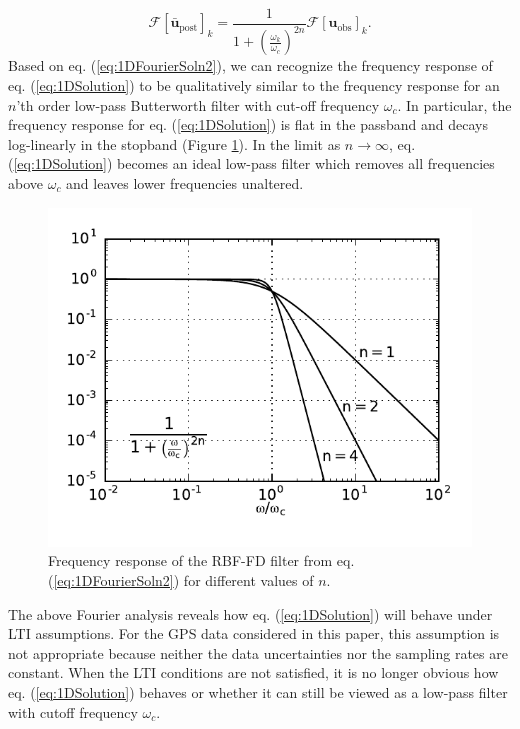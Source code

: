 \documentclass[10pt,a4paper]{article}
\begin{document}
\begin{equation}\label{eq:1DFourierSoln2}
\mathcal{F}\left[\mathbf{\bar{u}}_\mathrm{post}\right]_k = \frac{1}
                                {1 + \left(\frac{\omega_k}{\omega_c}\right)^{2n}}
                                \mathcal{F}\left[\mathbf{u}_\mathrm{obs}\right]_k.        
\end{equation}
Based on eq. (\ref{eq:1DFourierSoln2}), we can recognize the frequency response of eq. (\ref{eq:1DSolution}) to be qualitatively similar to the frequency response for an $n$'th order low-pass Butterworth filter with cut-off frequency $\omega_c$.  In particular, the frequency response for eq. (\ref{eq:1DSolution}) is flat in the passband and decays log-linearly in the stopband (Figure \ref{fig:FrequencyResponse}).  In the limit as $n\to \infty$, eq. (\ref{eq:1DSolution}) becomes an ideal low-pass filter which removes all frequencies above $\omega_c$ and leaves lower frequencies unaltered.  

\begin{figure}
\includegraphics[scale=1.0]{figures/figure1}
\caption{Frequency response of the RBF-FD filter from eq. (\ref{eq:1DFourierSoln2}) for different values of $n$.}   
\label{fig:FrequencyResponse}
\end{figure}

The above Fourier analysis reveals how eq. (\ref{eq:1DSolution}) will behave under LTI assumptions.  For the GPS data considered in this paper, this assumption is not appropriate because neither the data uncertainties nor the sampling rates are constant. When the LTI conditions are not satisfied, it is no longer obvious how eq. (\ref{eq:1DSolution}) behaves or whether it can still be viewed as a low-pass filter with cutoff frequency $\omega_c$.  
\end{document}
